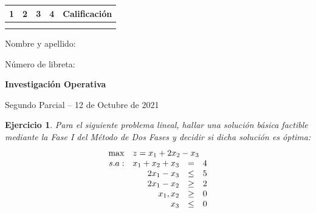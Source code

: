 \documentclass[a4paper,oneside,12pt]{amsart}
\newcommand{\nombremateria}
{Investigaci\'on Operativa}
\newcommand{\numeroparcial}
    { Segundo Parcial }
\newcommand{\fecha}
    {12 de Octubre de 2021}
\newtheorem{quest}{Ejercicio}
\begin{document}
\hfill \hfill
\begin{tabular}[c]{|c|c|c|c|c|}
\hline 
1 & 2 & 3 & 4 & Calificaci\'on \\ \hline \hline
\hspace{1 cm} & \hspace{1 cm} & \hspace{1 cm} & \hspace{1 cm} & \hspace{1.3 cm} \\
\hspace{1 cm} & \hspace{1  cm} & \hspace{1  cm} & \hspace{1  cm} & \hspace{1.3 cm} \\ \hline

\end{tabular}

\vspace{-1cm}

\noindent Nombre y apellido:

\vspace{0.2cm}

\noindent Número de libreta:

\noindent \hrulefill 

\smallskip
\renewcommand{\baselinestretch}{1.1}

\begin{center}
	\large \textbf{\nombremateria} 
	
	\numeroparcial -- \fecha
\end{center}

\renewcommand{\theenumi}{\textbf{\arabic{enumi}}}


\begin{quest} Para el siguiente problema lineal, hallar una solución básica factible mediante la Fase I del Método de Dos Fases y decidir si dicha solución es óptima:
    \[
    \begin{array}{rrcl}
    \max & \multicolumn{3}{l}{z = x_1+2x_2-x_3} \\
    s.a: & x_1+x_2+x_3 & = & 4 \\
     & 2x_1-x_3 & \leq & 5 \\
     & 2x_1-x_2 & \geq & 2 \\
     & x_1,x_2 & \geq & 0 \\
     & x_3 & \leq & 0
    \end{array}
    \]

\end{quest}
\end{document}
